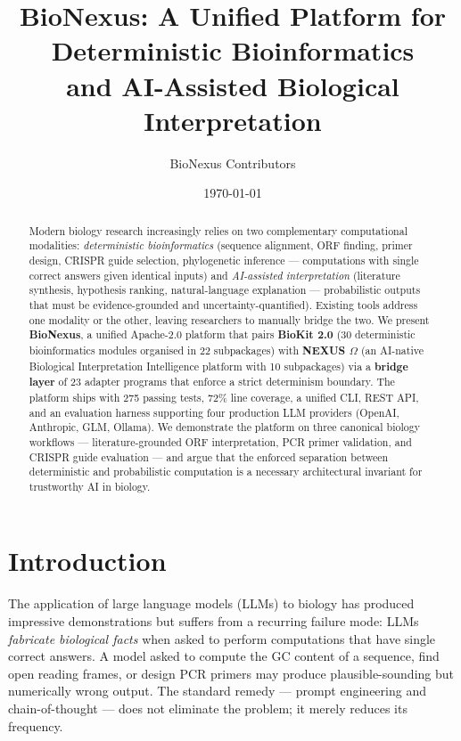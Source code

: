 \documentclass[11pt,a4paper]{article}
\title{BioNexus: A Unified Platform for Deterministic Bioinformatics \\
       and AI-Assisted Biological Interpretation}
\author{BioNexus Contributors}
\date{\today}
\begin{document}
\maketitle

\begin{abstract}
Modern biology research increasingly relies on two complementary computational
modalities: \emph{deterministic bioinformatics} (sequence alignment, ORF
finding, primer design, CRISPR guide selection, phylogenetic inference ---
computations with single correct answers given identical inputs) and
\emph{AI-assisted interpretation} (literature synthesis, hypothesis ranking,
natural-language explanation --- probabilistic outputs that must be
evidence-grounded and uncertainty-quantified). Existing tools address one
modality or the other, leaving researchers to manually bridge the two. We
present \textbf{BioNexus}, a unified Apache-2.0 platform that pairs
\textbf{BioKit 2.0} (30 deterministic bioinformatics modules organised in 22
subpackages) with \textbf{NEXUS $\Omega$} (an AI-native Biological
Interpretation Intelligence platform with 10 subpackages) via a
\textbf{bridge layer} of 23 adapter programs that enforce a strict
determinism boundary. The platform ships with 275 passing tests, 72\% line
coverage, a unified CLI, REST API, and an evaluation harness supporting
four production LLM providers (OpenAI, Anthropic, GLM, Ollama). We
demonstrate the platform on three canonical biology workflows ---
literature-grounded ORF interpretation, PCR primer validation, and CRISPR
guide evaluation --- and argue that the enforced separation between
deterministic and probabilistic computation is a necessary architectural
invariant for trustworthy AI in biology.
\end{abstract}

\section{Introduction}

The application of large language models (LLMs) to biology has produced
impressive demonstrations but suffers from a recurring failure mode: LLMs
\emph{fabricate biological facts} when asked to perform computations that
have single correct answers. A model asked to compute the GC content of a
sequence, find open reading frames, or design PCR primers may produce
plausible-sounding but numerically wrong output. The standard remedy ---
prompt engineering and chain-of-thought --- does not eliminate the problem;
it merely reduces its frequency.
\end{document}
